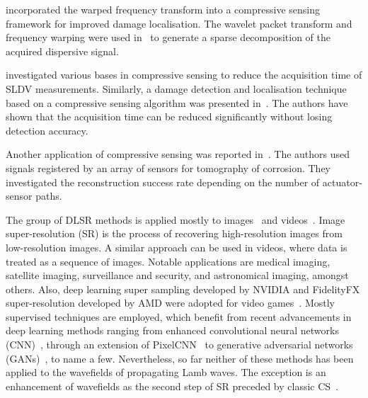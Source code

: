 \textcite{Perelli2012} incorporated the warped frequency transform into a compressive sensing framework for improved damage localisation.
The wavelet packet transform and frequency warping were used in~\cite{Perelli2015} to generate a sparse decomposition of the acquired dispersive signal.

\textcite{DiIanni2015} investigated various bases in compressive sensing to reduce the acquisition time of SLDV measurements.
Similarly, a damage detection and localisation technique based on a compressive sensing algorithm was presented in~\cite{KeshmiriEsfandabadi2018}.
The authors have shown that the acquisition time can be reduced significantly without losing detection accuracy.

Another application of compressive sensing was reported in~\cite{Chang2020}. 
The authors used signals registered by an array of sensors for tomography of corrosion.
They investigated the reconstruction success rate depending on the number of actuator-sensor paths.

The group of DLSR methods is applied mostly to images~\cite{Dahl2017,Zhang2018,Wang2019} and videos~\cite{Zhang2017,Yan2019}.
Image super-resolution (SR) is the process of recovering high-resolution images from low-resolution images.
A similar approach can be used in videos, where data is treated as a sequence of images.
Notable applications are medical imaging, satellite imaging, surveillance and security, and astronomical imaging, amongst others.
Also, deep learning super sampling developed by NVIDIA and FidelityFX super-resolution developed by AMD were adopted for video games~\cite{Claypool2006}.
Mostly supervised techniques are employed, which benefit from recent advancements in deep learning methods ranging from enhanced convolutional neural networks (CNN)~\cite{Zhang2017}, through an extension of PixelCNN~\cite{Dahl2017} to generative adversarial networks (GANs)~\cite{Wang2019}, to name a few.
Neverthe\-less, so far neither of these methods has been applied to the wavefields of propagating Lamb waves.
The exception is an enhancement of wavefields as the second step of SR preceded by classic CS~\cite{Park2017a,KeshmiriEsfandabadi2020}.